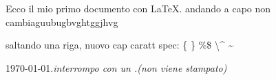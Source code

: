 \documentclass[a4paper]{article}
\begin{document}
	Ecco il mio primo documento con \LaTeX.%
	andando a capo non cambiaguubugbvghtggjhvg
	
	saltando una riga, nuovo cap
	caratt spec: \{ \} \%\$ \textbackslash\^{} \~{}

	\today.\emph{interrompo con un .(non viene stampato)}
\end{document}
